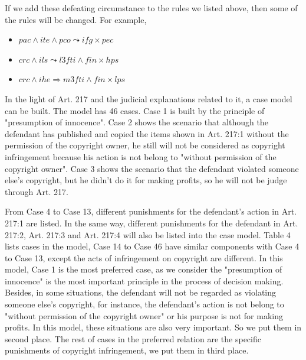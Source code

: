 \documentclass{IOS-Book-Article}
\begin{document}
If we add these defeating circumstance to the rules we listed above, then some of the rules will be changed. For example,
\begin{itemize}
\item $pac \wedge ite \wedge pco \leadsto ifg \times pec$
\item $crc \wedge ils \leadsto l3fti \wedge fin \times hps$
\item $crc \wedge ihe \Rightarrow m3fti \wedge fin \times lps$
\end{itemize}

In the light of Art. 217 and the judicial explanations related to it, a case model can be built. The model has 46 cases. Case 1 is built by the principle of "presumption of innocence". Case 2 shows the scenario that although the defendant has published and copied the items shown in Art. 217:1 without the permission of the copyright owner, he still will not be considered as copyright infringement because his action is not belong to "without permission of the copyright owner". Case 3 shows the scenario that the defendant violated someone else's copyright, but he didn't do it for making profits, so he will not be judge through Art. 217.

From Case 4 to Case 13, different punishments for the defendant's action in Art. 217:1 are listed. In the same way, different punishments for the defendant in Art. 217:2, Art. 217:3 and Art. 217:4 will also be listed into the case model. Table 4 lists cases in the model, Case 14 to Case 46 have similar components with Case 4 to Case 13, except the acts of infringement on copyright are different. In this model, Case 1 is the most preferred case, as we consider the "presumption of innocence" is the most important principle in the process of decision making. Besides, in some situations, the defendant will not be regarded as violating someone else's copyright, for instance, the defendant's action is not belong to "without permission of the copyright owner" or his purpose is not for making profits. In this model, these situations are also very important. So we put them in second place. The rest of cases in the preferred relation are the specific punishments of copyright infringement, we put them in third place.
\end{document}
